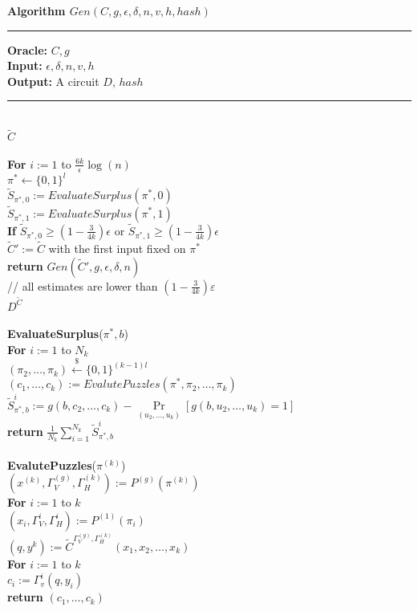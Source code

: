 %
%
\begin{codeblock}
  \textbf{Algorithm $Gen(C,g,\epsilon,\delta,n, v, h, hash)$}
  \medskip

  \hrule

  \medskip

  \textbf{Oracle:} $C, g$ \\
  \textbf{Input:}  $\epsilon, \delta, n, v, h$\\
  \textbf{Output:} A circuit $D$, $hash$
  \medskip\hrule\medskip
  \If {} \then \\
  \IndI \return $\widetilde{C}$ \\ \\
  \textbf{For} $i:=1$ to $\frac{6k}{\epsilon}\log(n)$ \\
  \IndI $\pi^* \leftarrow \{0,1\}^{l}$\\
  \IndI $\widetilde{S}_{\pi^*,0} := EvaluateSurplus(\pi^*, 0)$\\
  \IndI $\widetilde{S}_{\pi^*,1} := EvaluateSurplus(\pi^*, 1)$\\
  \IndI \textbf{If} $\widetilde{S}_{\pi^*,0} \geq (1 - \frac{3}{4k}) \epsilon$ or $\widetilde{S}_{\pi^*,1} \geq (1 - \frac{3}{4k}) \epsilon$ \\
  \IndII $\widetilde{C}' := \widetilde{C}$ with the first input fixed on $\pi^*$\\
  \IndII\textbf{return} $Gen(\widetilde{C}', g, \epsilon, \delta, n)$ \\
  // all estimates are lower than $(1-\frac{3}{4k})\varepsilon$\\
  \return $D^{\widetilde{C}}$ \\
  \\
  \textbf{EvaluateSurplus}($\pi^*, b$) \\
  \IndI \textbf{For} $i:=1$ to $N_k$ \\
  \IndII $(\pi_2, \dots, \pi_k) \xleftarrow{\$} \{0,1\}^{(k-1)l}$\\
  \IndII $(c_1, \dots, c_k) := EvalutePuzzles(\pi^*, \pi_2, \dots, \pi_k)$\\
  \IndII $\widetilde{S}_{\pi^*,b}^i := g(b, c_2, \dots, c_k) - \underset{(u_2, \dots, u_k)}{\Pr}[g(b, u_2, \dots, u_k) = 1] $\\
  \IndI \textbf{return} $\frac{1}{N_k} \sum_{i=1}^{N_k} \widetilde{S}_{\pi^*,b}^i$\\
  \\
  \textbf{EvalutePuzzles}($\pi^{(k)}$)\\
  \IndI $(x^{(k)}, \Gamma_V^{(g)}, \Gamma_H^{(k)}) := P^{(g)}(\pi^{(k)})$ \\
  \IndI \textbf{For} $i:=1$ to $k$\\
  \IndII $(x_i, \Gamma_V^{i}, \Gamma_H^{i}) := P^{(1)}(\pi_i)$\\
  \IndI $(q,y^{k}) := \widetilde{C}^{\Gamma_V^{(g)}, \Gamma_H^{(k)}}(x_1, x_2, \dots, x_k)$\\
  \IndI \textbf{For} $i:=1$ to $k$\\
  \IndII $c_i := \Gamma_v^{i}(q, y_i)$\\
  \IndI \textbf{return} $(c_1, \dots, c_k)$\\
\end{codeblock}
